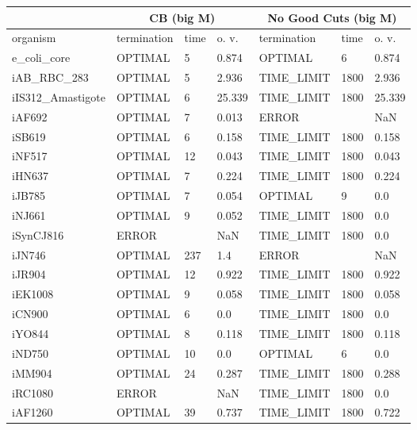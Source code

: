 \begin{table}[!ht]
    \small
    \centering
    \begin{tabular}{|l|l|l|l|l|l|l|}
    \hline
        \multicolumn{1}{|c}{} & \multicolumn{3}{|c|}{CB (big M)} & \multicolumn{3}{c|}{No Good Cuts (big M)}\\ \hline 
        organism & termination & time & o. v. & termination & time & o. v. \\ \hline
        e\_coli\_core & OPTIMAL & 5 & 0.874 & OPTIMAL & 6 & 0.874 \\ \hline
        iAB\_RBC\_283 & OPTIMAL & 5 & 2.936 & TIME\_LIMIT & 1800 & 2.936 \\ \hline
        iIS312\_Amastigote & OPTIMAL & 6 & 25.339 & TIME\_LIMIT & 1800 & 25.339 \\ \hline
        iAF692 & OPTIMAL & 7 & 0.013 & ERROR & ~ & NaN \\ \hline
        iSB619 & OPTIMAL & 6 & 0.158 & TIME\_LIMIT & 1800 & 0.158 \\ \hline
        iNF517 & OPTIMAL & 12 & 0.043 & TIME\_LIMIT & 1800 & 0.043 \\ \hline
        iHN637 & OPTIMAL & 7 & 0.224 & TIME\_LIMIT & 1800 & 0.224 \\ \hline
        iJB785 & OPTIMAL & 7 & 0.054 & OPTIMAL & 9 & 0.0 \\ \hline
        iNJ661 & OPTIMAL & 9 & 0.052 & TIME\_LIMIT & 1800 & 0.0 \\ \hline
        iSynCJ816 & ERROR & ~ & NaN & TIME\_LIMIT & 1800 & 0.0 \\ \hline
        iJN746 & OPTIMAL & 237 & 1.4 & ERROR & ~ & NaN \\ \hline
        iJR904 & OPTIMAL & 12 & 0.922 & TIME\_LIMIT & 1800 & 0.922 \\ \hline
        iEK1008 & OPTIMAL & 9 & 0.058 & TIME\_LIMIT & 1800 & 0.058 \\ \hline
        iCN900 & OPTIMAL & 6 & 0.0 & TIME\_LIMIT & 1800 & 0.0 \\ \hline
        iYO844 & OPTIMAL & 8 & 0.118 & TIME\_LIMIT & 1800 & 0.118 \\ \hline
        iND750 & OPTIMAL & 10 & 0.0 & OPTIMAL & 6 & 0.0 \\ \hline
        iMM904 & OPTIMAL & 24 & 0.287 & TIME\_LIMIT & 1800 & 0.288 \\ \hline
        iRC1080 & ERROR & ~ & NaN & TIME\_LIMIT & 1800 & 0.0 \\ \hline
        iAF1260 & OPTIMAL & 39 & 0.737 & TIME\_LIMIT & 1800 & 0.722 \\ \hline

\end{tabular}
\end{table}
